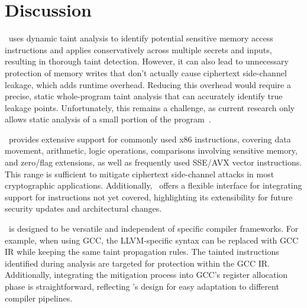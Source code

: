 \section{Discussion}
\label{sec:discussion}

\tool\ uses dynamic taint analysis to identify potential sensitive memory access instructions and applies conservatively across multiple secrets and inputs, resulting in thorough taint detection. 
However, it can also lead to unnecessary protection of memory writes that don't actually cause ciphertext side-channel leakage, which adds runtime overhead. 
Reducing this overhead would require a precise, static whole-program taint analysis that can accurately identify true leakage points. 
Unfortunately, this remains a challenge, as current research only allows static analysis of a small portion of the program~\cite{wang2019identifying, brotzman2019casym}.

\tool\ provides extensive support for commonly used x86 instructions, covering data movement, arithmetic, logic operations, comparisons involving sensitive memory, and zero/flag extensions, as well as frequently used SSE/AVX vector instructions. 
This range is sufficient to mitigate ciphertext side-channel attacks in most cryptographic applications. 
Additionally, \tool\ offers a flexible interface for integrating support for instructions not yet covered, highlighting its extensibility for future security updates and architectural changes.

\tool\ is designed to be versatile and independent of specific compiler frameworks. 
For example, when using GCC, the LLVM-specific syntax can be replaced with GCC IR while keeping the same taint propagation rules. 
The tainted instructions identified during analysis are targeted for protection within the GCC IR. 
Additionally, integrating the mitigation process into GCC's register allocation phase is straightforward, reflecting \tool's design for easy adaptation to different compiler pipelines.
